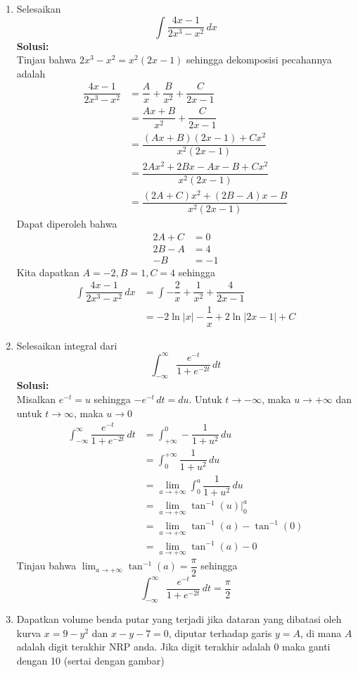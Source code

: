 \documentclass{article}
\begin{document}
\begin{enumerate}
	\newpage
	\item Selesaikan
	$$ \int \dfrac{4x-1}{2x^3-x^2}\, dx $$
	\textbf{Solusi:}\\
	Tinjau bahwa $2x^3-x^2=x^2(2x-1)$ sehingga dekomposisi pecahannya adalah 
	\begin{align*}
	\dfrac{4x-1}{2x^3-x^2} &= \dfrac{A}{x}+\dfrac{B}{x^2} + \dfrac{C}{2x-1}\\
	&= \dfrac{Ax+B}{x^2}+\dfrac{C}{2x-1}\\
	&= \dfrac{(Ax+B)(2x-1)+Cx^2}{x^2(2x-1)}\\
	&= \dfrac{2Ax^2+2Bx-Ax-B+Cx^2}{x^2(2x-1)}\\
	&= \dfrac{(2A+C)x^2+(2B-A)x-B}{x^2(2x-1)}
	\end{align*}
	Dapat diperoleh bahwa 
	\begin{align*}
	2A+C &= 0\\
	2B-A &= 4\\
	-B &= -1
	\end{align*}
	Kita dapatkan $A=-2,B=1,C=4$ sehingga
	\begin{align*}
	\int \dfrac{4x-1}{2x^3-x^2}\, dx &= \int -\dfrac{2}{x}+\dfrac{1}{x^2}+\dfrac{4}{2x-1}\\
	&= -2\ln|x| - \dfrac{1}{x} + 2\ln|2x-1| +C
	\end{align*}
	\item Selesaikan integral dari $$\int_{-\infty}^{\infty}\dfrac{e^{-t}}{1+e^{-2t}}\, dt$$
	\textbf{Solusi:}\\
	Misalkan $e^{-t}=u$ sehingga $-e^{-t}\, dt=du$. Untuk $t\rightarrow -\infty$, maka $u\rightarrow +\infty$ dan untuk $t\rightarrow \infty$, maka $u\rightarrow 0$
	\begin{align*}
	\int_{-\infty}^{\infty}\dfrac{e^{-t}}{1+e^{-2t}}\, dt &= \int_{+\infty}^{0}-\dfrac{1}{1+u^2}\, du \\
	&= \int_0^{+\infty} \dfrac{1}{1+u^2}\, du\\
	&= \lim_{a\rightarrow +\infty}\int_0^a \dfrac{1}{1+u^2}\, du\\
	&= \lim_{a\rightarrow +\infty} \tan^{-1}(u)\bigg|^a_0\\
	&= \lim_{a\rightarrow +\infty} \tan^{-1}(a)-\tan^{-1}(0)\\
	&= \lim_{a\rightarrow +\infty} \tan^{-1}(a)-0
	\end{align*}
	Tinjau bahwa $\displaystyle \lim_{a\rightarrow +\infty} \tan^{-1}(a)=\dfrac{\pi}{2}$ sehingga 
	$$ \int_{-\infty}^{\infty}\dfrac{e^{-t}}{1+e^{-2t}}\, dt = \dfrac{\pi}{2}$$
	\item Dapatkan volume benda putar yang terjadi jika dataran yang dibatasi oleh kurva $x=9-y^2$ dan $x-y-7=0$, diputar terhadap garis $y=A$, di mana $A$ adalah digit terakhir NRP anda. Jika digit terakhir adalah 0 maka ganti dengan 10 (sertai dengan gambar)\\

\end{enumerate}
\end{document}

